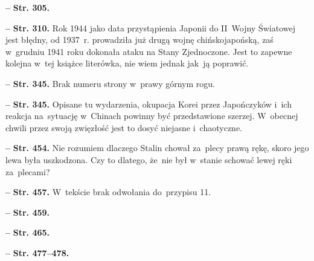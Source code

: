 \documentclass[a4paper,11pt]{article}
\newcommand{\spaceFour}{0.5em}
\newcommand{\tb}{\textbf}
\newcommand{\noi}{\noindent}
\newcommand{\start}{\noi \tb{--} {}}
\newcommand{\Str}[1]{\tb{Str. #1.}}
\begin{document}
\vspace{\spaceFour}


\start \Str{305}

\vspace{\spaceFour}


\start \Str{310} Rok 1944 jako data przystąpienia Japonii do II~Wojny
Światowej jest błędny, od 1937~r. prowadziła już drugą wojnę
chińsko\dywiz japońską, zaś w~grudniu 1941 roku dokonała ataku na
Stany Zjednoczone. Jest to zapewne kolejna w~tej książce literówka,
nie wiem jednak jak~ją poprawić.

\vspace{\spaceFour}


\start \Str{345} Brak numeru strony w~prawy górnym rogu.

\vspace{\spaceFour}


\start \Str{345} Opisane tu wydarzenia, okupacja Korei przez
Japończyków i~ich reakcja na~sytuację w~Chinach powinny być
przedstawione szerzej. W~obecnej chwili przez swoją zwięzłość jest to
dosyć niejasne i~chaotyczne.

\vspace{\spaceFour}


\start \Str{454} Nie rozumiem dlaczego Stalin chował za~plecy prawą
rękę, skoro jego lewa była uszkodzona. Czy to dlatego, że~nie był
w~stanie schować lewej ręki za~plecami?

\vspace{\spaceFour}


\start \Str{457} W~tekście brak odwołania do~przypisu 11.

\vspace{\spaceFour}


\start \Str{459}

\vspace{\spaceFour}


\start \Str{465}

\vspace{\spaceFour}


\start \Str{477--478}
\end{document}
